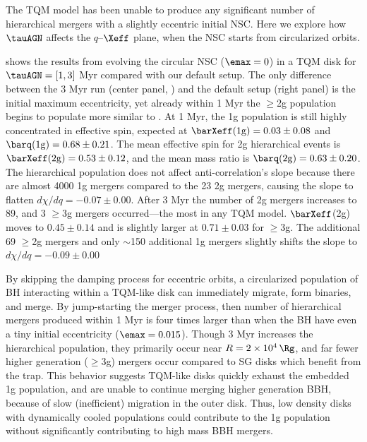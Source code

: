 
The TQM model has been unable to produce any significant number of hierarchical mergers with a slightly eccentric initial NSC.
Here we explore how $\tauAGN$ affects the $q$--$\Xeff$ plane, when the NSC starts from circularized orbits.

 shows the results from evolving the circular NSC ($\emax=0$) in a TQM disk for $\tauAGN=[1,3]$ Myr compared with our default setup.
The only difference between the 3 Myr run (center panel, ) and the default setup (right panel) is the initial maximum eccentricity, yet already within 1 Myr the $\geq$2g population begins to populate more similar to .
At 1 Myr, the 1g population is still highly concentrated in effective spin, expected at $\barXeff({\rm 1g})=0.03\pm0.08$ and $\barq({\rm 1g})=0.68\pm0.21$.
The mean effective spin for 2g hierarchical events is $\barXeff({\rm 2g})=0.53\pm0.12$, and the mean mass ratio is $\barq({\rm 2g})=0.63\pm0.20$.
The hierarchical population does not affect anti-correlation's slope because there are almost 4000 1g mergers compared to the 23 2g mergers, causing the slope to flatten $d\chi/dq=-0.07\pm0.00$.
After 3 Myr the number of 2g mergers increases to 89, and 3 $\geq$3g mergers occurred---the most in any TQM model.
$\barXeff$(2g) moves to $0.45\pm0.14$ and is slightly larger at $0.71\pm0.03$ for $\geq$3g.
The additional 69 $\geq$2g mergers and only $\sim$150 additional 1g mergers slightly shifts the slope to $d\chi/dq=-0.09\pm0.00$

By skipping the damping process for eccentric orbits, a circularized population of BH interacting within a TQM-like disk can immediately migrate, form binaries, and merge.
By jump-starting the merger process, then number of hierarchical mergers produced within 1 Myr is four times larger than when the BH have even a tiny initial eccentricity ($\emax=0.015$).
Though 3 Myr increases the hierarchical population, they primarily occur near $R=2\times10^4\,\Rg$, and far fewer higher generation ($\geq 3$g) mergers occur compared to SG disks which benefit from the trap.
This behavior suggests TQM-like disks quickly exhaust the embedded 1g population, and are unable to continue merging higher generation BBH, because of slow (inefficient) migration in the outer disk.
Thus, low density disks with dynamically cooled populations could contribute to the 1g population without significantly contributing to high mass BBH mergers.

